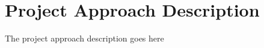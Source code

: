 \section{Project Approach Description}
\label{dseProjectApproachDescription}
The project approach description goes here